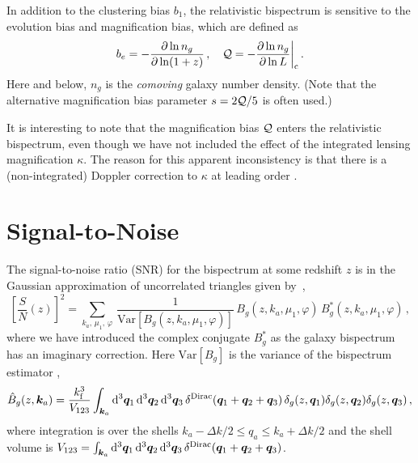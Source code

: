 In addition to the clustering bias  $b_1$, the relativistic bispectrum is sensitive to  the evolution bias and magnification bias, which  are defined as \cite{Alonso:2015uua}
\begin{equation} \label{bq}
b_e=  - \frac{\partial \ln n_g}{\partial\ln (1+z)}\,,~~~{ {\cal Q} =- \frac{\partial \ln n_g}{\partial\ln L}\bigg|_{\mathrm{c}}}\,.
\end{equation}
Here and below,  $n_{g}$ is the {\em comoving} galaxy number density.  (Note that the alternative magnification bias parameter  $s=2{\cal Q}/5$ is often used.)

{It is interesting to note that the magnification bias ${\cal Q}$ enters the relativistic bispectrum, even though we have not  included the effect of the integrated lensing magnification $\kappa$. The reason for this apparent inconsistency is that there is a (non-integrated) Doppler correction to $\kappa$ at leading order \cite{Bonvin:2008ni,Bolejko:2012uj}.} 


\section{Signal-to-Noise}

The signal-to-noise ratio (SNR) for the bispectrum at some redshift $z$ is in the Gaussian approximation of uncorrelated triangles given by~\citep{Scoccimarro:2003wn}, 
\begin{equation}
\left[\frac{S}{N}(z)\right]^{2} = 
\sum_{k_a,\,\mu_{1},\,\varphi}\,\frac{1}{{\mathrm{Var}} [{B_{g}}(z, k_a,\mu_{1},\varphi)]}
\,B_{g}(z, k_{a},  \mu_{1},\varphi)\,B^*_{g}(z, k_a, \mu_{1},\varphi)\,,\label{eq:snrdef} 
\end{equation} 
where we have introduced the complex conjugate $B^*_g$ as the galaxy bispectrum has an imaginary correction. Here ${\mathrm{Var}} [{B_{g}}]$ is the variance of the bispectrum estimator \citep{Chan:2016ehg},
\begin{equation} \label{hatb}
\hat{B}_g(z,\bm{k}_a) = \frac{k_{\mathrm{f}}^3}{V_{123}}\int_{\bm{k}_a}\mathrm{d}^3\bm{q}_1\, \mathrm{d}^3\bm{q}_2 \,\mathrm{d}^3\bm{q}_3\,\delta^{{\mathrm{Dirac}}}(\bm{q}_1+\bm{q}_2+\bm{q}_3)\, \delta_g(z,\bm{q}_1) \delta_g(z,\bm{q}_2) \delta_g(z,\bm{q}_3) \,,
\end{equation}
where integration is over the shells $k_a-\Delta k/2\leq q_a \leq k_a+\Delta k/2$ and  the shell volume is
$V_{123}=\int_{\bm{k}_a}\mathrm{d}^3\bm{q}_1\, \mathrm{d}^3\bm{q}_2 \,\mathrm{d}^3\bm{q}_3\,\delta^{{\mathrm{Dirac}}}(\bm{q}_1+\bm{q}_2+\bm{q}_3)$.


